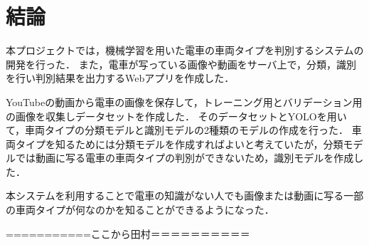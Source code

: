 

\chapter{結論}
本プロジェクトでは，機械学習を用いた電車の車両タイプを判別するシステムの開発を行った．
また，電車が写っている画像や動画をサーバ上で，分類，識別を行い判別結果を出力するWebアプリを作成した．

YouTubeの動画から電車の画像を保存して，トレーニング用とバリデーション用の画像を収集しデータセットを作成した．
そのデータセットとYOLOを用いて，車両タイプの分類モデルと識別モデルの2種類のモデルの作成を行った．
車両タイプを知るためには分類モデルを作成すればよいと考えていたが，分類モデルでは動画に写る電車の車両タイプの判別ができないため，識別モデルを作成した．

本システムを利用することで電車の知識がない人でも画像または動画に写る一部の車両タイプが何なのかを知ることができるようになった．


===========ここから田村＝＝＝＝＝＝＝＝＝＝